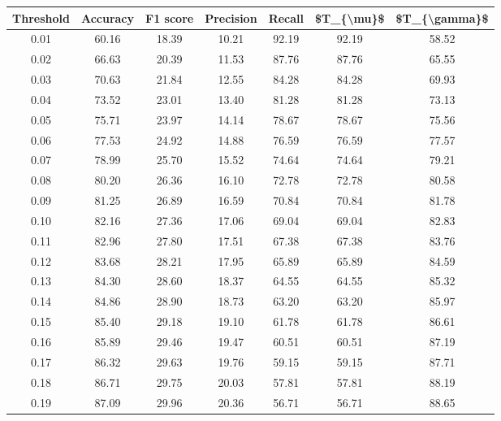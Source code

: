 \begin{tabular}{|c|c|c|c|c|c|c|}
\hline
 Threshold &  Accuracy &  F1 score &  Precision &  Recall &  \$T\_\{\textbackslash mu\}\$ &  \$T\_\{\textbackslash gamma\}\$ \\
\hline
      0.01 &     60.16 &     18.39 &      10.21 &   92.19 &      92.19 &         58.52 \\
      0.02 &     66.63 &     20.39 &      11.53 &   87.76 &      87.76 &         65.55 \\
      0.03 &     70.63 &     21.84 &      12.55 &   84.28 &      84.28 &         69.93 \\
      0.04 &     73.52 &     23.01 &      13.40 &   81.28 &      81.28 &         73.13 \\
      0.05 &     75.71 &     23.97 &      14.14 &   78.67 &      78.67 &         75.56 \\
      0.06 &     77.53 &     24.92 &      14.88 &   76.59 &      76.59 &         77.57 \\
      0.07 &     78.99 &     25.70 &      15.52 &   74.64 &      74.64 &         79.21 \\
      0.08 &     80.20 &     26.36 &      16.10 &   72.78 &      72.78 &         80.58 \\
      0.09 &     81.25 &     26.89 &      16.59 &   70.84 &      70.84 &         81.78 \\
      0.10 &     82.16 &     27.36 &      17.06 &   69.04 &      69.04 &         82.83 \\
      0.11 &     82.96 &     27.80 &      17.51 &   67.38 &      67.38 &         83.76 \\
      0.12 &     83.68 &     28.21 &      17.95 &   65.89 &      65.89 &         84.59 \\
      0.13 &     84.30 &     28.60 &      18.37 &   64.55 &      64.55 &         85.32 \\
      0.14 &     84.86 &     28.90 &      18.73 &   63.20 &      63.20 &         85.97 \\
      0.15 &     85.40 &     29.18 &      19.10 &   61.78 &      61.78 &         86.61 \\
      0.16 &     85.89 &     29.46 &      19.47 &   60.51 &      60.51 &         87.19 \\
      0.17 &     86.32 &     29.63 &      19.76 &   59.15 &      59.15 &         87.71 \\
      0.18 &     86.71 &     29.75 &      20.03 &   57.81 &      57.81 &         88.19 \\
      0.19 &     87.09 &     29.96 &      20.36 &   56.71 &      56.71 &         88.65 \\

\end{tabular}
